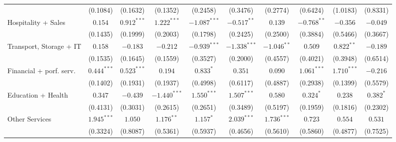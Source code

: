 \begin{tabular}{l|ccc|ccc|ccc|}
                                 &        (0.1084) &        (0.1632) &        (0.1352) &        (0.2458) &        (0.3476) &        (0.2774) &        (0.6424) &        (1.0183) &        (0.8331) \\
Hospitality + Sales              &         $0.154$ &   $0.912^{***}$ &   $1.222^{***}$ &  $-1.087^{***}$ &   $-0.517^{**}$ &         $0.139$ &   $-0.768^{**}$ &        $-0.356$ &        $-0.049$ \\
                                 &        (0.1435) &        (0.1999) &        (0.2003) &        (0.1798) &        (0.2425) &        (0.2500) &        (0.3884) &        (0.5466) &        (0.3667) \\
Transport, Storage + IT          &         $0.158$ &        $-0.183$ &        $-0.212$ &  $-0.939^{***}$ &  $-1.338^{***}$ &   $-1.046^{**}$ &         $0.509$ &    $0.822^{**}$ &        $-0.189$ \\
                                 &        (0.1535) &        (0.1645) &        (0.1559) &        (0.3527) &        (0.2000) &        (0.4557) &        (0.4021) &        (0.3948) &        (0.6514) \\
Financial + porf. serv.          &   $0.444^{***}$ &   $0.523^{***}$ &         $0.194$ &       $0.833^*$ &         $0.351$ &         $0.090$ &   $1.061^{***}$ &   $1.710^{***}$ &        $-0.216$ \\
                                 &        (0.1402) &        (0.1931) &        (0.1937) &        (0.4998) &        (0.6117) &        (0.4887) &        (0.2938) &        (0.1399) &        (0.5579) \\
Education + Health               &         $0.347$ &        $-0.439$ &  $-1.440^{***}$ &   $1.550^{***}$ &   $1.507^{***}$ &         $0.580$ &       $0.324^*$ &         $0.238$ &       $0.382^*$ \\
                                 &        (0.4131) &        (0.3031) &        (0.2615) &        (0.2651) &        (0.3489) &        (0.5197) &        (0.1959) &        (0.1816) &        (0.2302) \\
Other Services                   &   $1.945^{***}$ &         $1.050$ &    $1.176^{**}$ &       $1.157^*$ &   $2.039^{***}$ &   $1.736^{***}$ &         $0.723$ &         $0.554$ &         $0.531$ \\
                                 &        (0.3324) &        (0.8087) &        (0.5361) &        (0.5937) &        (0.4656) &        (0.5610) &        (0.5860) &        (0.4877) &        (0.7525) \\

\end{tabular}
